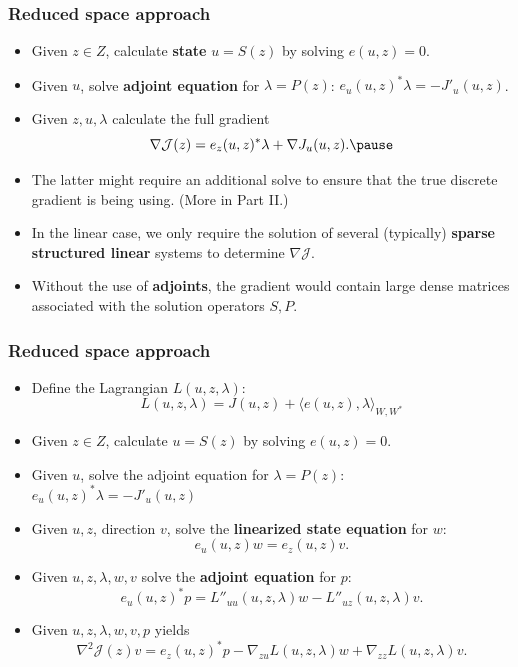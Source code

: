 \documentclass[aspectratio=169,xcolor=dvipsnames,10pt]{beamer}
\begin{document}
\begin{frame}\frametitle{Reduced space approach}
\begin{example}[Gradient Computation of $\mathcal{J}(S(z)) = J(S(z),z)$]
\begin{itemize}
\item Given $z \in Z$, calculate \textbf{state} $u = S(z)$ by solving $e(u,z) = 0$. \pause
\item Given $u$, solve \textbf{adjoint equation} for $\lambda = P(z)$: $e_{u}(u,z)^* \lambda = -J'_u(u,z)$.\pause
\item Given $z,u,\lambda$ calculate the full gradient 
\[
\nabla \mathcal{J}(z) = e_{z}(u,z)^* \lambda + \nabla J_u(u,z).\pause
\]\vspace{-4ex}
\item The latter might require an additional solve to ensure that the true discrete gradient is being using. (More in Part II.)\pause
\item In the linear case, we only require the solution of several (typically) \textbf{sparse structured linear} systems to determine $\nabla \mathcal{J}$.\pause
\item Without the use of \textbf{adjoints}, the gradient would contain large dense matrices associated with the solution operators $S, P$.
\end{itemize}
\end{example}
\end{frame}

\begin{frame}\frametitle{Reduced space approach}
\begin{example}[Hessian Computation of $\mathcal{J}(S(z)) = J(S(z),z)$]
\begin{itemize}
\item Define the Lagrangian $L(u,z,\lambda)$:
\[
L(u,z,\lambda) = J(u,z) + \langle e(u,z), \lambda \rangle_{W,W^*}
\]
\item \pause Given $z \in Z$, calculate $u = S(z)$ by solving $e(u,z) = 0$. \pause
\item Given $u$, solve the adjoint equation for $\lambda = P(z)$: $e_{u}(u,z)^* \lambda = -J'_u(u,z)$\pause
\item Given $u,z$, direction $v$, solve the \textbf{linearized state equation} for $w$:
\[
e_u(u,z) w = e_z(u,z)v.
\]
\item \pause  Given $u,z,\lambda,w,v$ solve the \textbf{adjoint equation} for $p$:
\[
e_{u}(u,z)^* p = L''_{uu}(u,z,\lambda)w - L''_{uz}(u,z,\lambda)v.
\]
\item \pause Given $u,z,\lambda,w,v,p$ yields
\[
\nabla^2 \mathcal{J}(z) v = e_{z}(u,z)^*p - \nabla_{zu} L(u,z,\lambda)w + \nabla_{zz} L(u,z,\lambda) v.
\]
\end{itemize}
\end{example}
\end{frame}
\end{document}
